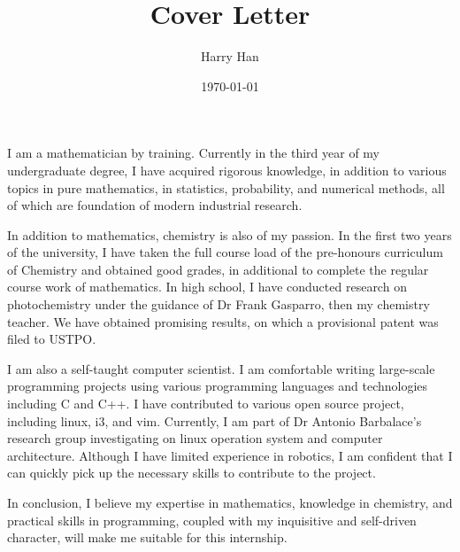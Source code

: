 \documentclass[11pt]{article}
\title{Cover Letter}
\author{Harry Han}
\date{\today}
\begin{document}
\maketitle

I am a mathematician by training. Currently in the third year of my undergraduate degree, I have acquired rigorous knowledge, in addition to various topics in pure mathematics, in statistics, probability, and numerical methods, all of which are foundation of modern industrial research.

In addition to mathematics, chemistry is also of my passion.
In the first two years of the university, I have taken the full course load of the pre-honours curriculum of Chemistry and obtained good grades, in additional to complete the regular course work of mathematics. 
In high school, I have conducted research on photochemistry under the guidance of Dr Frank Gasparro, then my chemistry teacher. We have obtained promising results, on which a provisional patent was filed to USTPO. 

I am also a self-taught computer scientist. I am comfortable writing large-scale programming projects using various programming languages and technologies including C and C++. I have contributed to various open source project, including linux, i3, and vim. Currently, I am part of Dr Antonio Barbalace's research group investigating on linux operation system and computer architecture.
Although I have limited experience in robotics, I am confident that I can quickly pick up the necessary skills to contribute to the project.

In conclusion, I believe my expertise in mathematics, knowledge in chemistry, and practical skills in programming, coupled with my inquisitive and self-driven character, will make me suitable for this internship.
\end{document}
